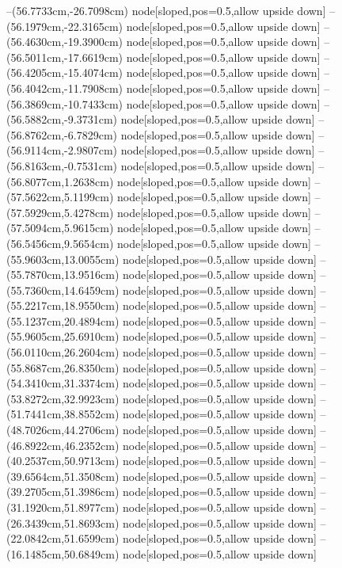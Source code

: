 --(56.7733cm,-26.7098cm) node[sloped,pos=0.5,allow upside down]{\arrowIn}
--(56.1979cm,-22.3165cm) node[sloped,pos=0.5,allow upside down]{\ArrowIn}
--(56.4630cm,-19.3900cm) node[sloped,pos=0.5,allow upside down]{\ArrowIn}
--(56.5011cm,-17.6619cm) node[sloped,pos=0.5,allow upside down]{\ArrowIn}
--(56.4205cm,-15.4074cm) node[sloped,pos=0.5,allow upside down]{\ArrowIn}
--(56.4042cm,-11.7908cm) node[sloped,pos=0.5,allow upside down]{\ArrowIn}
--(56.3869cm,-10.7433cm) node[sloped,pos=0.5,allow upside down]{\ArrowIn}
--(56.5882cm,-9.3731cm) node[sloped,pos=0.5,allow upside down]{\ArrowIn}
--(56.8762cm,-6.7829cm) node[sloped,pos=0.5,allow upside down]{\ArrowIn}
--(56.9114cm,-2.9807cm) node[sloped,pos=0.5,allow upside down]{\ArrowIn}
--(56.8163cm,-0.7531cm) node[sloped,pos=0.5,allow upside down]{\ArrowIn}
--(56.8077cm,1.2638cm) node[sloped,pos=0.5,allow upside down]{\ArrowIn}
--(57.5622cm,5.1199cm) node[sloped,pos=0.5,allow upside down]{\ArrowIn}
--(57.5929cm,5.4278cm) node[sloped,pos=0.5,allow upside down]{\arrowIn}
--(57.5094cm,5.9615cm) node[sloped,pos=0.5,allow upside down]{\arrowIn}
--(56.5456cm,9.5654cm) node[sloped,pos=0.5,allow upside down]{\ArrowIn}
--(55.9603cm,13.0055cm) node[sloped,pos=0.5,allow upside down]{\ArrowIn}
--(55.7870cm,13.9516cm) node[sloped,pos=0.5,allow upside down]{\arrowIn}
--(55.7360cm,14.6459cm) node[sloped,pos=0.5,allow upside down]{\arrowIn}
--(55.2217cm,18.9550cm) node[sloped,pos=0.5,allow upside down]{\ArrowIn}
--(55.1237cm,20.4894cm) node[sloped,pos=0.5,allow upside down]{\ArrowIn}
--(55.9605cm,25.6910cm) node[sloped,pos=0.5,allow upside down]{\ArrowIn}
--(56.0110cm,26.2604cm) node[sloped,pos=0.5,allow upside down]{\arrowIn}
--(55.8687cm,26.8350cm) node[sloped,pos=0.5,allow upside down]{\arrowIn}
--(54.3410cm,31.3374cm) node[sloped,pos=0.5,allow upside down]{\ArrowIn}
--(53.8272cm,32.9923cm) node[sloped,pos=0.5,allow upside down]{\ArrowIn}
--(51.7441cm,38.8552cm) node[sloped,pos=0.5,allow upside down]{\ArrowIn}
--(48.7026cm,44.2706cm) node[sloped,pos=0.5,allow upside down]{\ArrowIn}
--(46.8922cm,46.2352cm) node[sloped,pos=0.5,allow upside down]{\ArrowIn}
--(40.2537cm,50.9713cm) node[sloped,pos=0.5,allow upside down]{\ArrowIn}
--(39.6564cm,51.3508cm) node[sloped,pos=0.5,allow upside down]{\arrowIn}
--(39.2705cm,51.3986cm) node[sloped,pos=0.5,allow upside down]{\arrowIn}
--(31.1920cm,51.8977cm) node[sloped,pos=0.5,allow upside down]{\ArrowIn}
--(26.3439cm,51.8693cm) node[sloped,pos=0.5,allow upside down]{\ArrowIn}
--(22.0842cm,51.6599cm) node[sloped,pos=0.5,allow upside down]{\ArrowIn}
--(16.1485cm,50.6849cm) node[sloped,pos=0.5,allow upside down]{\ArrowIn}
